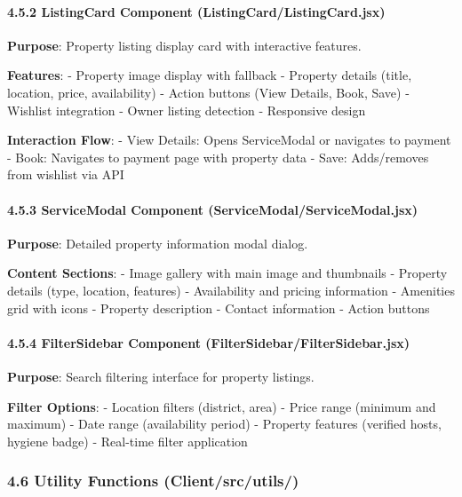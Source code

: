 \documentclass[12pt,a4paper]{article}
\begin{document}
\hypertarget{listingcard-component-listingcardlistingcard.jsx}{%
\paragraph{4.5.2 ListingCard Component
(ListingCard/ListingCard.jsx)}\label{listingcard-component-listingcardlistingcard.jsx}}

\textbf{Purpose}: Property listing display card with interactive
features.

\textbf{Features}: - Property image display with fallback - Property
details (title, location, price, availability) - Action buttons (View
Details, Book, Save) - Wishlist integration - Owner listing detection -
Responsive design

\textbf{Interaction Flow}: - View Details: Opens ServiceModal or
navigates to payment - Book: Navigates to payment page with property
data - Save: Adds/removes from wishlist via API

\hypertarget{servicemodal-component-servicemodalservicemodal.jsx}{%
\paragraph{4.5.3 ServiceModal Component
(ServiceModal/ServiceModal.jsx)}\label{servicemodal-component-servicemodalservicemodal.jsx}}

\textbf{Purpose}: Detailed property information modal dialog.

\textbf{Content Sections}: - Image gallery with main image and
thumbnails - Property details (type, location, features) - Availability
and pricing information - Amenities grid with icons - Property
description - Contact information - Action buttons

\hypertarget{filtersidebar-component-filtersidebarfiltersidebar.jsx}{%
\paragraph{4.5.4 FilterSidebar Component
(FilterSidebar/FilterSidebar.jsx)}\label{filtersidebar-component-filtersidebarfiltersidebar.jsx}}

\textbf{Purpose}: Search filtering interface for property listings.

\textbf{Filter Options}: - Location filters (district, area) - Price
range (minimum and maximum) - Date range (availability period) -
Property features (verified hosts, hygiene badge) - Real-time filter
application

\hypertarget{utility-functions-clientsrcutils}{%
\subsubsection{4.6 Utility Functions
(Client/src/utils/)}\label{utility-functions-clientsrcutils}}
\end{document}
